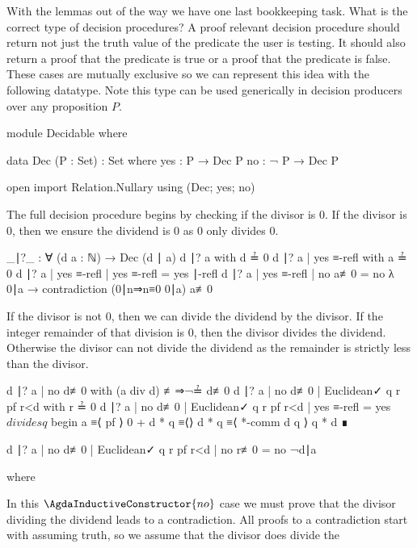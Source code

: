 \documentclass[./Thesis.tex]{subfiles}
\begin{document}
With the lemmas out of the way we have one last bookkeeping task. What is the
correct type of decision procedures? A proof relevant decision procedure should
return not just the truth value of the predicate the user is testing. It should
also return a proof that the predicate is true or a proof that the predicate is
false. These cases are mutually exclusive so we can represent this idea with the
following datatype. Note this type can be used generically in decision producers
over any proposition $P$.
\begin{code}[hide]
  module Decidable where
\end{code}
\begin{code}
    data Dec (P : Set) : Set where
      yes :   P → Dec P
      no  : ¬ P → Dec P
\end{code}
\begin{code}[hide]
  open import Relation.Nullary using (Dec; yes; no)
\end{code}
The full decision procedure begins by checking if the divisor is $0$. If the
divisor is $0$, then we ensure the dividend is $0$ as $0$ only divides $0$.
\begin{code}
  _∣?_ : ∀ (d a : ℕ) → Dec (d ∣ a)
  d ∣? a with d ≟ 0
  d ∣? a | yes ≡-refl with a ≟ 0
  d ∣? a | yes ≡-refl | yes ≡-refl = yes ∣-refl
  d ∣? a | yes ≡-refl | no a≢0 = no λ 0∣a → contradiction (0∣n⇒n≡0 0∣a) a≢0
\end{code}
If the divisor is not $0$, then we can divide the dividend by the divisor. If
the integer remainder of that division is $0$, then the divisor divides the
dividend. Otherwise the divisor can not divide the dividend as the remainder is
strictly less than the divisor.
\begin{code}
  d ∣? a | no d≢0 with (a div d) {≢⇒¬≟ d≢0}
  d ∣? a | no d≢0 | Euclidean✓ q r pf r<d with r ≟ 0
  d ∣? a | no d≢0 | Euclidean✓ q r pf r<d | yes ≡-refl =
    yes $ divides q $ begin
      a ≡⟨ pf ⟩
      0 + d * q ≡⟨⟩
      d * q ≡⟨ *-comm d q ⟩
      q * d ∎
\end{code}
\begin{code}
  d ∣? a | no d≢0 | Euclidean✓ q r pf r<d | no r≢0 = no ¬d∣a
\end{code}
\begin{code}[hide]
    where
\end{code}
In this $\AgdaInductiveConstructor{no}$ case we must prove that the divisor
dividing the dividend leads to a contradiction. All proofs to a contradiction
start with assuming truth, so we assume that the divisor does divide the
\end{document}

